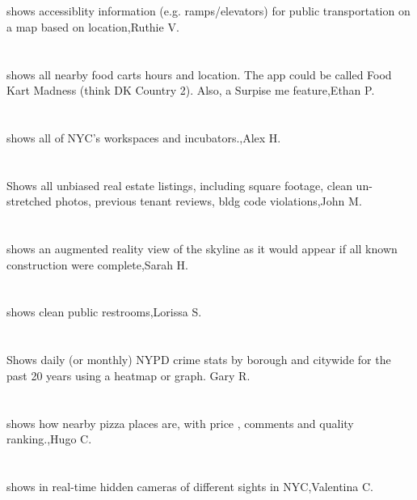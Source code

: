 \section{}shows accessiblity information (e.g. ramps/elevators) for public transportation on a map based on location,Ruthie V.
\section{}  shows all nearby food carts hours and location. The app could be called Food Kart Madness (think DK Country 2). Also, a Surpise me feature,Ethan P.
\section{}shows all of NYC's workspaces and incubators.,Alex H.
\section{}Shows all unbiased real estate listings, including square footage, clean un-stretched photos, previous tenant reviews, bldg code violations,John M.
\section{}shows an augmented reality view of the skyline as it would appear if all known construction were complete,Sarah H.
\section{} shows clean public restrooms,Lorissa S.
\section{}Shows daily (or monthly)  NYPD crime stats by borough and citywide for the past 20 years using a heatmap or graph. Gary R.
\section{}shows how nearby pizza places are, with price , comments and quality ranking.,Hugo C.
\section{}shows in real-time hidden cameras of different sights in NYC,Valentina C.
